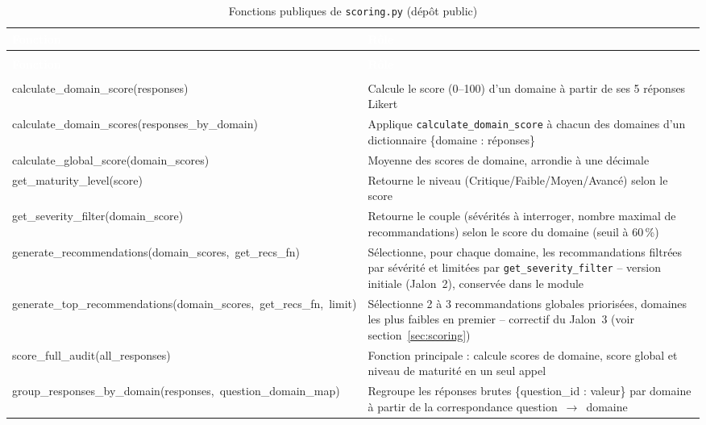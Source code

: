\begin{longtable}{|>{\ttfamily\raggedright\scriptsize}p{4.8cm}|p{9.2cm}|}
  \caption{Fonctions publiques de \texttt{scoring.py} (dépôt public)} \label{tab:mod_scoring} \\
  \hline
  \rowcolor{iacsTableHead}
  \textcolor{white}{\textnormal{\textbf{Fonction}}} & \textcolor{white}{\textbf{Rôle}} \\
  \hline
  \endfirsthead
  \multicolumn{2}{c}{\tablename\ \thetable\ -- suite de la page précédente} \\
  \hline
  \rowcolor{iacsTableHead}
  \textcolor{white}{\textnormal{\textbf{Fonction}}} & \textcolor{white}{\textbf{Rôle}} \\
  \hline
  \endhead
  \hline
  \multicolumn{2}{r}{\textit{suite page suivante}} \\
  \endfoot
  \hline
  \endlastfoot
  calculate\_\allowbreak domain\_\allowbreak score(responses) & Calcule le score (0--100) d'un domaine à partir de ses 5 réponses Likert \\
  \hline
  \rowcolor{iacsLightGray}
  calculate\_\allowbreak domain\_\allowbreak scores(\allowbreak responses\_by\_domain) & Applique \texttt{\scriptsize calculate\_domain\_score} à chacun des domaines d'un dictionnaire \{domaine : réponses\} \\
  \hline
  calculate\_\allowbreak global\_\allowbreak score(domain\_scores) & Moyenne des scores de domaine, arrondie à une décimale \\
  \hline
  \rowcolor{iacsLightGray}
  get\_\allowbreak maturity\_\allowbreak level(score) & Retourne le niveau (Critique/Faible/Moyen/Avancé) selon le score \\
  \hline
  get\_\allowbreak severity\_\allowbreak filter(\allowbreak domain\_score) & Retourne le couple (sévérités à interroger, nombre maximal de recommandations) selon le score du domaine (seuil à 60\,\%) \\
  \hline
  \rowcolor{iacsLightGray}
  generate\_\allowbreak recommendations(\allowbreak domain\_scores,\allowbreak\ get\_recs\_fn) & Sélectionne, pour chaque domaine, les recommandations filtrées par sévérité et limitées par \texttt{\scriptsize get\_severity\_filter} -- version initiale (Jalon~2), conservée dans le module \\
  \hline
  generate\_\allowbreak top\_\allowbreak recommendations(\allowbreak domain\_scores,\allowbreak\ get\_recs\_fn,\allowbreak\ limit) & Sélectionne 2 à 3 recommandations globales priorisées, domaines les plus faibles en premier -- correctif du Jalon~3 (voir section~\ref{sec:scoring}) \\
  \hline
  score\_\allowbreak full\_\allowbreak audit(all\_responses) & Fonction principale : calcule scores de domaine, score global et niveau de maturité en un seul appel \\
  \hline
  \rowcolor{iacsLightGray}
  group\_\allowbreak responses\_\allowbreak by\_\allowbreak domain(\allowbreak responses,\allowbreak\ question\_domain\_map) & Regroupe les réponses brutes \{question\_id : valeur\} par domaine à partir de la correspondance question~$\rightarrow$~domaine \\
  \hline
\end{longtable}

